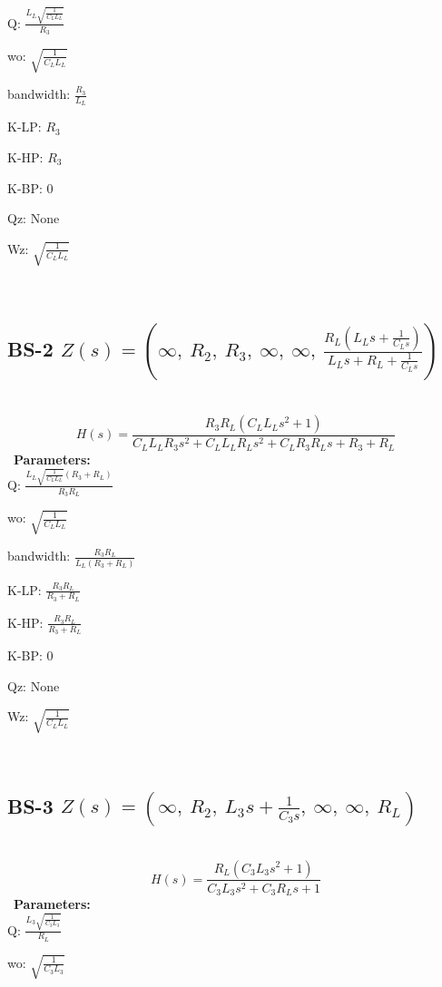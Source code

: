 \documentclass{article}
\begin{document}
Q: $\frac{L_{L} \sqrt{\frac{1}{C_{L} L_{L}}}}{R_{3}}$\ 

wo: $\sqrt{\frac{1}{C_{L} L_{L}}}$\ 

bandwidth: $\frac{R_{3}}{L_{L}}$\ 

K-LP: $R_{3}$\ 

K-HP: $R_{3}$\ 

K-BP: $0$\ 

Qz: $\text{None}$\ 

Wz: $\sqrt{\frac{1}{C_{L} L_{L}}}$\ 

\ 

\subsection{BS-2 $Z(s) = \left( \infty, \  R_{2}, \  R_{3}, \  \infty, \  \infty, \  \frac{R_{L} \left(L_{L} s + \frac{1}{C_{L} s}\right)}{L_{L} s + R_{L} + \frac{1}{C_{L} s}}\right)$ } \ 
\textbf{\[H(s) = \frac{R_{3} R_{L} \left(C_{L} L_{L} s^{2} + 1\right)}{C_{L} L_{L} R_{3} s^{2} + C_{L} L_{L} R_{L} s^{2} + C_{L} R_{3} R_{L} s + R_{3} + R_{L}}\] } \ 
\textbf{Parameters:}\\ 

Q: $\frac{L_{L} \sqrt{\frac{1}{C_{L} L_{L}}} \left(R_{3} + R_{L}\right)}{R_{3} R_{L}}$\ 

wo: $\sqrt{\frac{1}{C_{L} L_{L}}}$\ 

bandwidth: $\frac{R_{3} R_{L}}{L_{L} \left(R_{3} + R_{L}\right)}$\ 

K-LP: $\frac{R_{3} R_{L}}{R_{3} + R_{L}}$\ 

K-HP: $\frac{R_{3} R_{L}}{R_{3} + R_{L}}$\ 

K-BP: $0$\ 

Qz: $\text{None}$\ 

Wz: $\sqrt{\frac{1}{C_{L} L_{L}}}$\ 

\ 

\subsection{BS-3 $Z(s) = \left( \infty, \  R_{2}, \  L_{3} s + \frac{1}{C_{3} s}, \  \infty, \  \infty, \  R_{L}\right)$ } \ 
\textbf{\[H(s) = \frac{R_{L} \left(C_{3} L_{3} s^{2} + 1\right)}{C_{3} L_{3} s^{2} + C_{3} R_{L} s + 1}\] } \ 
\textbf{Parameters:}\\ 

Q: $\frac{L_{3} \sqrt{\frac{1}{C_{3} L_{3}}}}{R_{L}}$\ 

wo: $\sqrt{\frac{1}{C_{3} L_{3}}}$\ 
\end{document}
